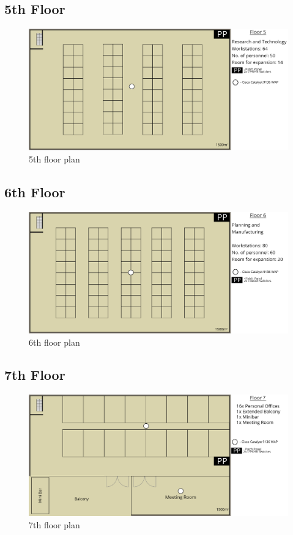 \subsection{5th Floor}
\begin{figure}[H]
    \includegraphics[width=15cm]{Figures/5th-Floor.png}
    \caption{5th floor plan}
    \label{fig:5th_floor}
\end{figure}
\subsection{6th Floor}
\begin{figure}[H]
    \includegraphics[width=15cm]{Figures/6th-Floor.png}
    \caption{6th floor plan}
    \label{fig:6th_floor}
\end{figure}
\subsection{7th Floor}
\begin{figure}[H]
    \includegraphics[width=15cm]{Figures/7th-floor.png}
    \caption{7th floor plan}
    \label{fig:7th_floor}
\end{figure}